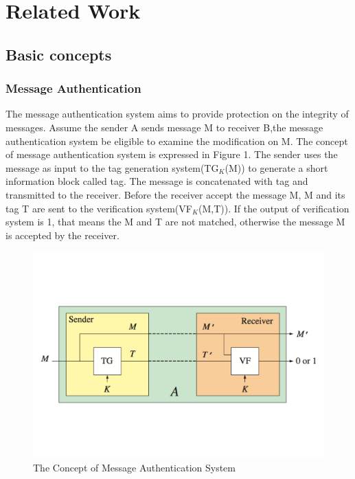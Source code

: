 \documentclass{article}
\begin{document}
\section{Related Work}
\subsection{Basic concepts}
\subsubsection{Message Authentication}
The message authentication system aims to provide protection on the integrity of messages. Assume the sender A sends message M to receiver B,the message authentication system be eligible to examine the modification on M. The concept of message authentication system is expressed in Figure 1. The sender uses the message as input to the tag generation system(TG$_K$(M)) to generate a short information block called tag. The message is concatenated with tag and transmitted to the receiver. Before the receiver accept the message M, M and its tag T are sent to the verification system(VF$_K$(M,T)). If the output of verification system is 1, that means the M and T are not matched, otherwise the message M is accepted by the receiver. 
\begin{figure}[htbp]
\centering
\includegraphics[scale=0.4]{./diagram/ma.pdf}
\caption{The Concept of Message Authentication System}
\label{fig: }
\end{figure}
\end{document}
